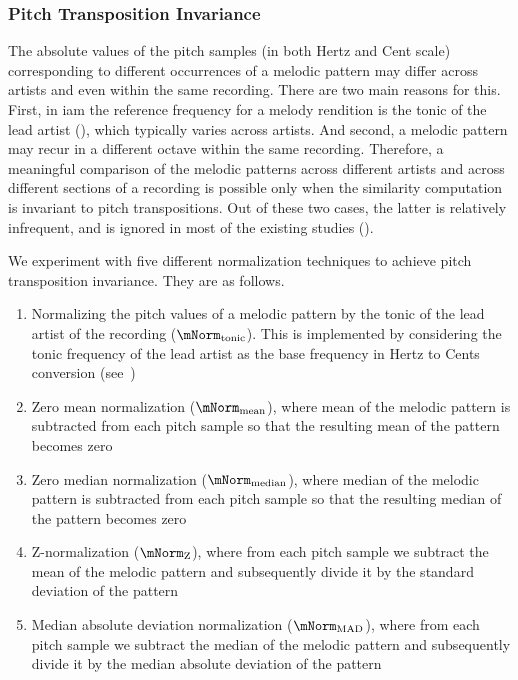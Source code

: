 \subsubsection{Pitch Transposition Invariance}
\label{sec:patterns_melodic_similarity_transposition_invariance}

The absolute values of the pitch samples (in both Hertz and Cent scale) corresponding to different occurrences of a melodic pattern may differ across artists and even within the same recording. There are two main reasons for this. First, in \gls{iam} the reference frequency for a melody rendition is the tonic of the lead artist (), which typically varies across artists. And second, a melodic pattern may recur in a different octave within the same recording. Therefore, a meaningful comparison of the melodic patterns across different artists and across different sections of a recording is possible only when the similarity computation is invariant to pitch transpositions. Out of these two cases, the latter is relatively infrequent, and is ignored in most of the existing studies ().

We experiment with five different normalization techniques to achieve pitch transposition invariance. They are as follows. 

\begin{enumerate}
	\item Normalizing the pitch values of a melodic pattern by the tonic of the lead artist of the recording ($\mNorm_{\mathrm{tonic}}$). This is implemented by considering the tonic frequency of the lead artist as the base frequency in Hertz to Cents conversion (see~)

	\item Zero mean normalization ($\mNorm_{\mathrm{mean}}$), where mean of the melodic pattern is subtracted from each pitch sample so that the resulting mean of the pattern becomes zero
	
	\item Zero median normalization ($\mNorm_{\mathrm{median}}$), where median of the melodic pattern is subtracted from each pitch sample so that the resulting median of the pattern becomes zero
	\item Z-normalization ($\mNorm_{\mathrm{Z}}$), where from each pitch sample we subtract the mean of the melodic pattern and subsequently divide it by the standard deviation of the pattern
	\item Median absolute deviation normalization ($\mNorm_{\mathrm{MAD}}$), where from each pitch sample we subtract the median of the melodic pattern and subsequently divide it by the median absolute deviation of the pattern
\end{enumerate}

